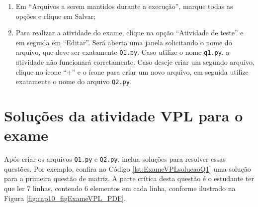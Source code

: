 \begin{enumerate}
    \item Em ``Arquivos a serem mantidos durante a execução'', marque todas as opções e clique em Salvar;

    \item Para realizar a atividade do exame, clique na opção ``Atividade de teste'' e em seguida em ``Editar''. Será aberta uma janela solicitando o nome do arquivo, que deve ser exatamente \verb|Q1.py|. Caso utilize o nome \verb|q1.py|, a atividade não funcionará corretamente. Caso deseje criar um segundo arquivo, clique no ícone ``+'' e o ícone para criar um novo arquivo, em seguida utilize exatamente o nome do arquivo \verb|Q2.py|.
    
\end{enumerate}



\section{Soluções da atividade VPL para o exame}

Após criar os arquivos \verb|Q1.py| e \verb|Q2.py|, inclua soluções para resolver essas questões. Por exemplo, confira no Código \ref{lst:ExameVPLsolucaoQ1} uma solução para a primeira questão de matriz. A parte crítica desta questão é o estudante ter que ler 7 linhas, contendo 6 elementos em cada linha, conforme ilustrado na Figura \ref{fig:cap10_figExameVPL_PDF}. 


